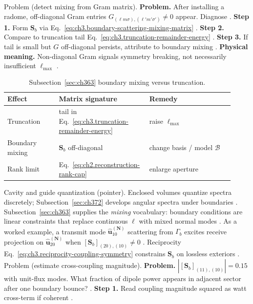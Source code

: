 Problem (detect mixing from Gram matrix). \textbf{Problem.} After installing a radome, off-diagonal Gram entries
\(G_{(\ell m\sigma),(\ell'm'\sigma')}\neq0\) appear. Diagnose \cite{harrington2001}.
\textbf{Step 1.} Form \(\mathbf{S}_{b}\) via Eq.~\eqref{eq:ch3.boundary-scattering-mixing-matrix} \cite{hansen1988}.
\textbf{Step 2.} Compare to truncation tail Eq.~\eqref{eq:ch3.truncation-remainder-energy} \cite{harrington2001}.
\textbf{Step 3.} If tail is small but \(G\) off-diagonal persists, attribute to boundary mixing \cite{stratton1941}.
\textbf{Physical meaning.} Non-diagonal Gram signals symmetry breaking, not necessarily insufficient \(\ell_{\max}\)
\cite{harrington2001}.
\begin{table}[t]
\centering
\caption{Subsection~\ref{sec:ch363} boundary mixing versus truncation.}
\label{tab:ch3.363-mixing-vs-truncation}
\small
\begin{tabular}{@{}p{0.22\linewidth}p{0.34\linewidth}p{0.36\linewidth}@{}}
\toprule
Effect & Matrix signature & Remedy \\
\midrule
Truncation & tail in Eq.~\eqref{eq:ch3.truncation-remainder-energy} & raise \(\ell_{\max}\) \\
Boundary mixing & \(\mathbf{S}_{b}\) off-diagonal & change basis / model \(\mathcal{B}\) \\
Rank limit & Eq.~\eqref{eq:ch2.reconstruction-rank-cap} & enlarge aperture \\
\bottomrule
\end{tabular}
\end{table}
Cavity and guide quantization (pointer). Enclosed volumes quantize spectra discretely; Subsection~\ref{sec:ch372} develops angular spectra under boundaries
\cite{stratton1941}. Subsection~\ref{sec:ch363} supplies the \emph{mixing} vocabulary: boundary
conditions are linear constraints that replace continuous \(\ell\) with mixed normal modes \cite{hansen1988}.
As a worked example, a transmit mode \(\widehat{\mathbf{u}}_{10}^{(\mathbf{N})}\) scattering from \(\Gamma_{b}\) excites receive projection on
\(\widehat{\mathbf{u}}_{20}^{(\mathbf{N})}\) when \([\mathbf{S}_{b}]_{(20),(10)}\neq0\) \cite{harrington2001}.
Reciprocity Eq.~\eqref{eq:ch3.reciprocity-coupling-symmetry} constrains \(\mathbf{S}_{b}\) on lossless exteriors
\cite{stratton1941}.
Problem (estimate cross-coupling magnitude). \textbf{Problem.} \(|[\mathbf{S}_{b}]_{(11),(10)}|=0.15\) with unit-flux modes. What fraction of dipole power appears in
adjacent sector after one boundary bounce? \cite{harrington2001}.
\textbf{Step 1.} Read coupling magnitude squared as watt cross-term if coherent \cite{poynting1884}.
